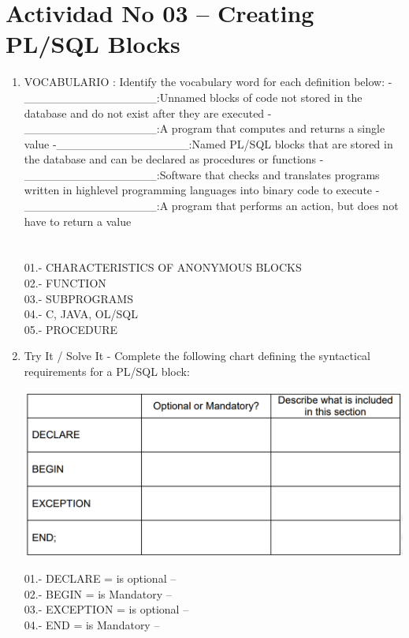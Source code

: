 \section{Actividad No 03 –  Creating PL/SQL Blocks} 
		
\begin{enumerate}[1.]
	\item VOCABULARIO :
	\subitem Identify the vocabulary word for each definition below:
	-\_\_\_\_\_\_\_\_\_\_\_\_\_\_\_\_:Unnamed blocks of code not stored in the database and do not exist after they are executed
	-\_\_\_\_\_\_\_\_\_\_\_\_\_\_\_\_:A program that computes and returns a single value
	-\_\_\_\_\_\_\_\_\_\_\_\_\_\_\_\_:Named PL/SQL blocks that are stored in the database and can be declared as procedures or functions
	-\_\_\_\_\_\_\_\_\_\_\_\_\_\_\_\_:Software that checks and translates programs written in highlevel programming languages into binary code to execute
	-\_\_\_\_\_\_\_\_\_\_\_\_\_\_\_\_:A program that performs an action, but does not have to return a value
	\\\\
	\\01.- CHARACTERISTICS OF ANONYMOUS BLOCKS
	\\02.- FUNCTION
	\\03.- SUBPROGRAMS
	\\04.- C, JAVA, OL/SQL
	\\05.- PROCEDURE

	\item Try It / Solve It
	- Complete the following chart defining the syntactical requirements for a PL/SQL block:
	\begin{center}
	\includegraphics[width=15cm]{./Imagenes/actividad01}  
	\end{center}	

	   01.- DECLARE	= is optional -- 
	\\02.- BEGIN		= is Mandatory --
	\\03.- EXCEPTION	= is optional --
	\\04.- END		= is Mandatory --\\


\end{enumerate}
